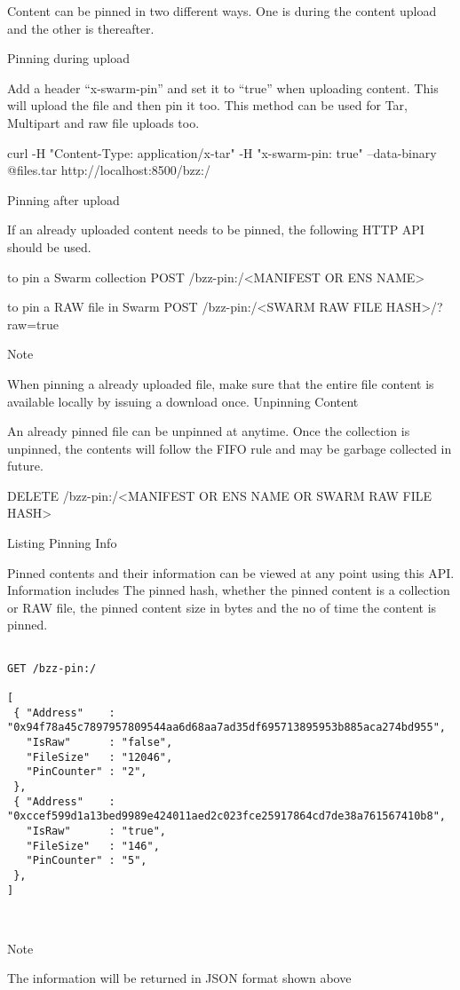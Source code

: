 Content can be pinned in two different ways. One is during the content upload and the other is thereafter.

    Pinning during upload

    Add a header “x-swarm-pin” and set it to “true” when uploading content. This will upload the file and then pin it too. This method can be used for Tar, Multipart and raw file uploads too.

curl -H "Content-Type: application/x-tar" -H "x-swarm-pin: true"  --data-binary @files.tar http://localhost:8500/bzz:/

    Pinning after upload

    If an already uploaded content needs to be pinned, the following HTTP API should be used.

to pin a Swarm collection
POST /bzz-pin:/<MANIFEST OR ENS NAME>

to pin a RAW file in Swarm
POST /bzz-pin:/<SWARM RAW FILE HASH>/?raw=true

Note

When pinning a already uploaded file, make sure that the entire file content is available locally by issuing a download once.
Unpinning Content

An already pinned file can be unpinned at anytime. Once the collection is unpinned, the contents will follow the FIFO rule and may be garbage collected in future.

DELETE /bzz-pin:/<MANIFEST OR ENS NAME OR SWARM RAW FILE HASH>

Listing Pinning Info

Pinned contents and their information can be viewed at any point using this API. Information includes The pinned hash, whether the pinned content is a collection or RAW file, the pinned content size in bytes and the no of time the content is pinned.


\begin{lstlisting}

GET /bzz-pin:/

[
 { "Address"    : "0x94f78a45c7897957809544aa6d68aa7ad35df695713895953b885aca274bd955",
   "IsRaw"      : "false",
   "FileSize"   : "12046",
   "PinCounter" : "2",
 },
 { "Address"    : "0xccef599d1a13bed9989e424011aed2c023fce25917864cd7de38a761567410b8",
   "IsRaw"      : "true",
   "FileSize"   : "146",
   "PinCounter" : "5",
 },
]

    
\end{lstlisting}
Note

The information will be returned in JSON format shown above
